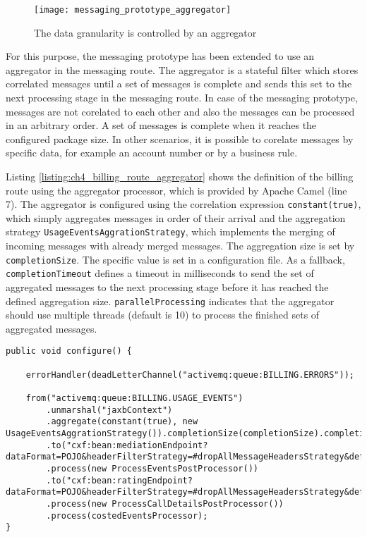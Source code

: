 \begin{figure}[htbp]
	\centering
	\texttt{[image: messaging\_prototype\_aggregator]}
	\caption{The data granularity is controlled by an aggregator}
	\label{fig:ch4_messaging_prototype_aggregator}
\end{figure}

For this purpose, the messaging prototype has been extended to use an aggregator in the messaging route. The aggregator is a stateful filter which stores correlated messages until a set of messages is complete and sends this set to the next processing stage in the messaging route. In case of the messaging prototype, messages are not corelated to each other and also the messages can be processed in an arbitrary order. A set of messages is complete when it reaches the configured package size. In other scenarios, it is possible to corelate messages by specific data, for example an account number or by a business rule.

Listing \ref{listing:ch4_billing_route_aggregator} shows the definition of the billing route using the aggregator processor, which is provided by Apache Camel (line 7). The aggregator is configured using the correlation expression \lstinline$constant(true)$, which simply aggregates messages in order of their arrival and the aggregation strategy \lstinline$UsageEventsAggrationStrategy$, which implements the merging of incoming messages with already merged messages. The aggregation size is set by \lstinline$completionSize$. The specific value is set in a configuration file. As a fallback, \lstinline$completionTimeout$ defines a timeout in milliseconds to send the set of aggregated messages to the next processing stage before it has reached the defined aggregation size. \lstinline$parallelProcessing$ indicates that the aggregator should use multiple threads (default is 10) to process the finished sets of aggregated messages.

\begin{lstlisting}[caption={Billing route definition with an additional aggregator},label=listing:ch4_billing_route_aggregator]
public void configure() {
		
	errorHandler(deadLetterChannel("activemq:queue:BILLING.ERRORS"));
	
	from("activemq:queue:BILLING.USAGE_EVENTS")
		.unmarshal("jaxbContext")
		.aggregate(constant(true), new UsageEventsAggrationStrategy()).completionSize(completionSize).completionTimeout(completionTimeout).parallelProcessing()
		.to("cxf:bean:mediationEndpoint?dataFormat=POJO&headerFilterStrategy=#dropAllMessageHeadersStrategy&defaultOperationName=processEvents")
		.process(new ProcessEventsPostProcessor())
		.to("cxf:bean:ratingEndpoint?dataFormat=POJO&headerFilterStrategy=#dropAllMessageHeadersStrategy&defaultOperationName=processCallDetails")
		.process(new ProcessCallDetailsPostProcessor())
		.process(costedEventsProcessor);
}
\end{lstlisting}

